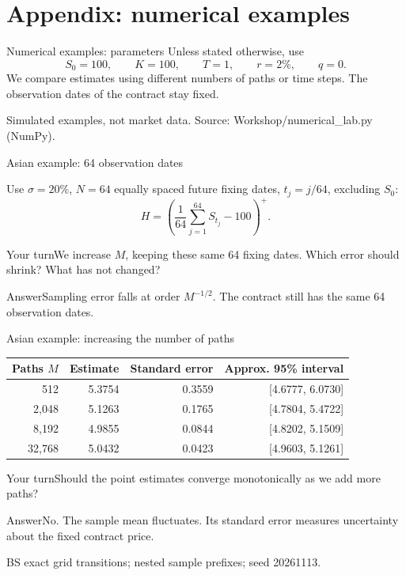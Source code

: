 \documentclass[handout,10pt,t,aspectratio=169]{beamer}
\newenvironment{pausebox}{\begin{block}{Your turn}}{\end{block}}
\newenvironment{answerbox}{\begin{exampleblock}{Answer}}{\end{exampleblock}}
\newcommand{\source}[1]{\vfill{\scriptsize\color{gray}#1\par}}
\begin{document}
\section{Appendix: numerical examples}
\begin{frame}{Numerical examples: parameters}
\small
Unless stated otherwise, use
\[
 S_0=100,\qquad K=100,\qquad T=1,\qquad r=2\%,\qquad q=0.
\]
We compare estimates using different numbers of paths or time steps.
The observation dates of the contract stay fixed.
\source{Simulated examples, not market data. Source: Workshop/numerical\_lab.py (NumPy).}
\end{frame}
\begin{frame}{Asian example: 64 observation dates}

    Use \(\sigma=20\%\), \(N=64\) equally spaced future fixing dates,
    \(t_j=j/64\), excluding \(S_0\):
    \[H=\left(\frac1{64}\sum_{j=1}^{64}S_{t_j}-100\right)^+.\]
    \begin{pausebox}We increase \(M\), keeping these same 64 fixing dates.
    Which error should shrink? What has not changed?\end{pausebox}
    \begin{answerbox}Sampling error falls at order \(M^{-1/2}\).
    The contract still has the same 64 observation dates.\end{answerbox}
\end{frame}
\begin{frame}{Asian example: increasing the number of paths}

    \begin{center}\begin{tabular}{rrrr}
    \toprule Paths \(M\) & Estimate & Standard error & Approx. 95\% interval\\\midrule
    512 & 5.3754 & 0.3559 & [4.6777, 6.0730]\\
2,048 & 5.1263 & 0.1765 & [4.7804, 5.4722]\\
8,192 & 4.9855 & 0.0844 & [4.8202, 5.1509]\\
32,768 & 5.0432 & 0.0423 & [4.9603, 5.1261]\\
    \bottomrule\end{tabular}\end{center}
    \begin{pausebox}Should the point estimates converge monotonically as
    we add more paths?\end{pausebox}
    \begin{answerbox}No. The sample mean fluctuates.
    Its standard error measures uncertainty about the fixed contract price.
    \end{answerbox}
    \source{BS exact grid transitions; nested sample prefixes; seed 20261113.}
\end{frame}
\end{document}
